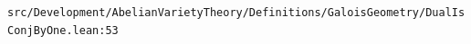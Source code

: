\nolinkurl{src/Development/AbelianVarietyTheory/Definitions/GaloisGeometry/DualIsConjByOne.lean:53}%
